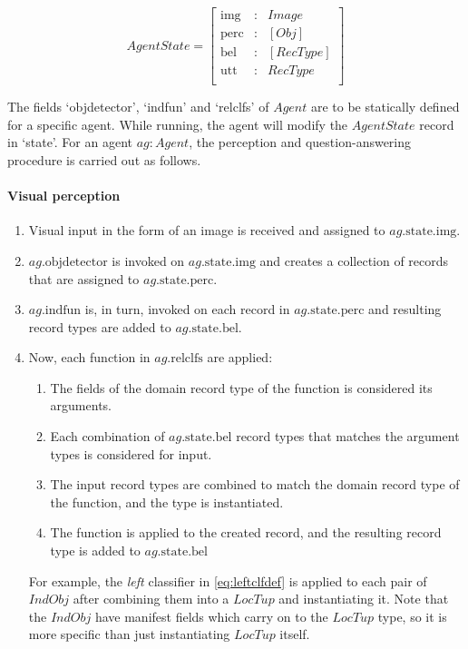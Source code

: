 \begin{equation}\label{eq:state}
AgentState = \left[\begin{array}{rcl}
    \text{img} &:& Image \\
    \text{perc} &:& [Obj] \\
    \text{bel} &:& [RecType] \\
    \text{utt} &:& RecType \\
    \end{array}\right]
\end{equation}

The fields `objdetector', `indfun' and `relclfs' of $Agent$ are to be statically defined for a specific agent.
While running, the agent will modify the $AgentState$ record in `state'.
For an agent $ag : Agent$, the perception and question-answering procedure is carried out as follows.

\paragraph{Visual perception}

\begin{enumerate}
\item Visual input in the form of an image is received and assigned to $ag.\text{state}.\text{img}$.
\item $ag.\text{objdetector}$ is invoked on $ag.\text{state.img}$ and creates a collection of records that are assigned to $ag.\text{state}.\text{perc}$.
\item $ag.\text{indfun}$ is, in turn, invoked on each record in $ag.\text{state.perc}$ and resulting record types are added to $ag.\text{state.bel}$.
\item Now, each function in $ag.\text{relclfs}$ are applied:
	\begin{enumerate}
	\item The fields of the domain record type of the function is considered its arguments.
	\item Each combination of $ag.\text{state.bel}$ record types that matches the argument types is considered for input.
	\item The input record types are combined to match the domain record type of the function, and the type is instantiated.
	\item The function is applied to the created record, and the resulting record type is added to $ag.\text{state.bel}$
	\end{enumerate}
	For example, the \textit{left} classifier in \autoref{eq:leftclfdef} is applied to each pair of $IndObj$ after combining them into a $LocTup$ and instantiating it.
    Note that the $IndObj$ have manifest fields which carry on to the $LocTup$ type, so it is more specific than just instantiating $LocTup$ itself.
\end{enumerate}



